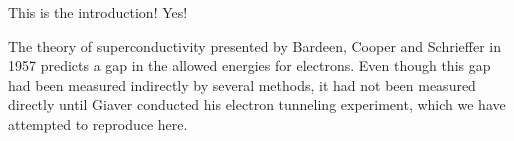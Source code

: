 
This is the introduction! Yes!

The theory of superconductivity presented by Bardeen, Cooper and Schrieffer in 1957 predicts a gap in the allowed energies for electrons. Even though this gap had been measured indirectly by several methods, it had not been measured directly until Giaver conducted his electron tunneling experiment, which we have attempted to reproduce here.


